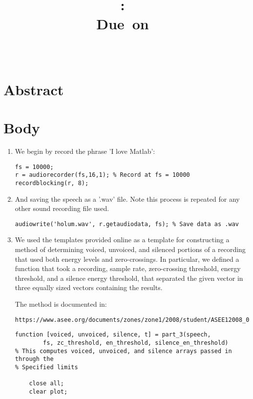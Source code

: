 \documentclass[11pt]{article}
\title{
\vspace{2in}
\textmd{\textbf{\hmwkClass:\ \hmwkTitle}}\\
\normalsize\vspace{0.1in}\small{Due\ on\ \hmwkDueDate}\\
\vspace{0.1in}\large{\textit{\hmwkClassInstructor\ \hmwkClassTime}}
\vspace{3in}
}
\author{\textbf{\hmwkAuthorName}}
\date{} %
\begin{document}


\section{Abstract}



\section{Body}

\begin{enumerate} 
\item We begin by record the phrase 'I love Matlab':
\begin{lstlisting} 
fs = 10000;
r = audiorecorder(fs,16,1); % Record at fs = 10000
recordblocking(r, 8);
\end{lstlisting}

\item And saving the speech as a '.wav' file. Note this process is repeated for any other sound recording file used.
\begin{lstlisting}
audiowrite('holum.wav', r.getaudiodata, fs); % Save data as .wav
\end{lstlisting}


\item We used the templates provided online as a template for constructing a method of determining voiced, unvoiced, and silenced portions of a recording that used both energy levels and zero-crossings. In particular, we defined a function that took a recording, sample rate, zero-crossing threshold, energy threshold, and a silence energy threshold, that separated the given vector in three equally sized vectors containing the results.

The method is documented in: 
\begin{verbatim}
https://www.asee.org/documents/zones/zone1/2008/student/ASEE12008_0044_paper.pdf
\end{verbatim}

\begin{lstlisting}
function [voiced, unvoiced, silence, t] = part_3(speech, 
		fs, zc_threshold, en_threshold, silence_en_threshold)
% This computes voiced, unvoiced, and silence arrays passed in through the
% Specified limits

    close all;
    clear plot;


\end{lstlisting}
\end{enumerate}
\end{document}
